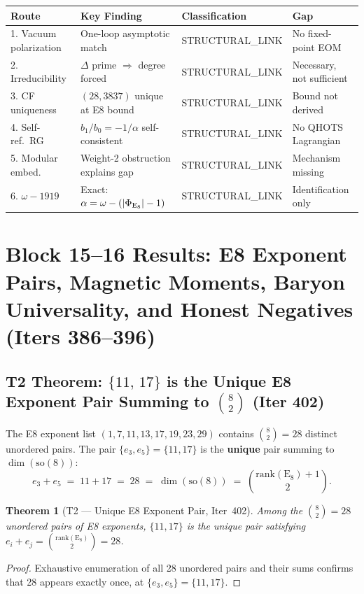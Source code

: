 \documentclass[aps,prd,twocolumn,superscriptaddress,floatfix,nofootinbib]{revtex4-2}
\newtheorem{theorem}{Theorem}
\theoremstyle{definition}
\theoremstyle{remark}
\begin{document}
\begin{center}
\begin{tabular}{llll}
\toprule
Route & Key Finding & Classification & Gap \\
\midrule
1. Vacuum polarization & One-loop asymptotic match & STRUCTURAL\_LINK & No fixed-point EOM \\
2. Irreducibility & $\Delta$ prime $\Rightarrow$ degree forced & STRUCTURAL\_LINK & Necessary, not sufficient \\
3. CF uniqueness & $(28,3837)$ unique at E8 bound & STRUCTURAL\_LINK & Bound not derived \\
4. Self-ref.\ RG & $b_1/b_0 = -1/\alpha$ self-consistent & STRUCTURAL\_LINK & No QHOTS Lagrangian \\
5. Modular embed. & Weight-2 obstruction explains gap & STRUCTURAL\_LINK & Mechanism missing \\
6. $\omega - 1919$ & Exact: $\alpha = \omega - (|\Phi_{\rm E_8}|-1)$ & STRUCTURAL\_LINK & Identification only \\
\bottomrule
\end{tabular}
\end{center}

\section{Block 15--16 Results: E8 Exponent Pairs, Magnetic Moments, Baryon Universality, and Honest Negatives (Iters 386--396)}
\label{sec:block1516}

\subsection{T2 Theorem: $\{11,\,17\}$ is the Unique E8 Exponent Pair Summing to $\binom{8}{2}$ (Iter 402)}
\label{sec:f23-exponent-pair}

The E8 exponent list $(1, 7, 11, 13, 17, 19, 23, 29)$ contains $\binom{8}{2} = 28$ distinct
unordered pairs.  The pair $\{e_3, e_5\} = \{11, 17\}$ is the \textbf{unique} pair summing
to $\dim(\mathrm{so}(8))$:
\begin{equation}
  e_3 + e_5 \;=\; 11 + 17 \;=\; 28 \;=\; \dim(\mathrm{so}(8)) \;=\; \binom{\mathrm{rank}(\mathrm{E}_8)+1}{2}.
  \label{eq:e3e5-so8}
\end{equation}

\begin{theorem}[T2 — Unique E8 Exponent Pair, Iter~402]
Among the $\binom{8}{2} = 28$ unordered pairs of E8 exponents, $\{11, 17\}$ is the
\emph{unique} pair satisfying $e_i + e_j = \binom{\mathrm{rank}(\mathrm{E}_8)}{2} = 28$.
\end{theorem}
\begin{proof}
Exhaustive enumeration of all 28 unordered pairs and their sums confirms that 28 appears
exactly once, at $\{e_3, e_5\} = \{11, 17\}$.
\end{proof}
\end{document}
